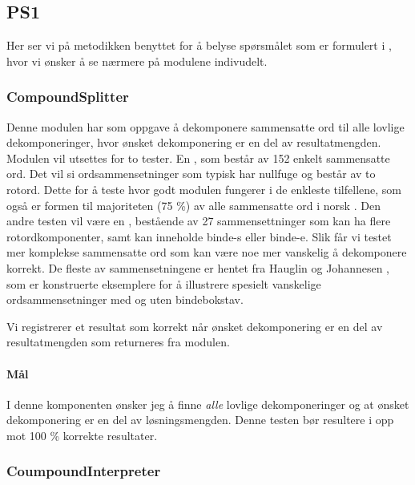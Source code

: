 \subsection{PS1}

Her ser vi på metodikken benyttet for å belyse spørsmålet som er formulert i , hvor vi ønsker å se nærmere på modulene indivudelt.

\subsubsection{CompoundSplitter}

Denne modulen har som oppgave å dekomponere sammensatte ord til alle lovlige dekomponeringer, hvor ønsket dekomponering er en del av resultatmengden. Modulen vil utsettes for to tester. En , som består av 152 enkelt sammensatte ord. Det vil si ordsammensetninger som typisk har nullfuge og består av to rotord. Dette for å teste hvor godt modulen fungerer i de enkleste tilfellene, som også er formen til majoriteten (75 \%) av alle sammensatte ord i norsk \cite{johannessen1996automatic}. Den andre testen vil være en , bestående av 27 sammensettninger som kan ha flere rotordkomponenter, samt kan inneholde binde-s eller binde-e. Slik får vi testet mer komplekse sammensatte ord som kan være noe mer vanskelig å dekomponere korrekt. De fleste av sammensetningene er hentet fra Hauglin og Johannesen \cite{johannessen1996automatic}, som er konstruerte eksemplere for å illustrere spesielt vanskelige ordsammensetninger med og uten bindebokstav.

Vi registrerer et resultat som korrekt når ønsket dekomponering er en del av resultatmengden som returneres fra modulen.

\newline
{}

\paragraph{Mål} I denne komponenten ønsker jeg å finne \textit{alle} lovlige dekomponeringer og at ønsket dekomponering er en del av løsningsmengden. Denne testen bør resultere i opp mot 100 \% korrekte resultater. 
	
\subsubsection{CoumpoundInterpreter}

